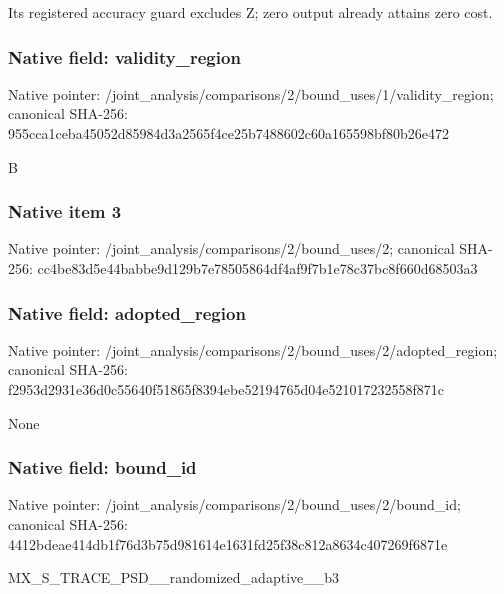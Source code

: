 \documentclass[10pt,a4paper]{article}
\begin{document}
\begingroup\raggedright\sloppy Its registered accuracy guard excludes Z;\allowbreak{} zero output already attains zero cost.\par\endgroup

\subsubsection{Native field: validity\_\allowbreak{}region}
Native pointer: /joint\_\allowbreak{}analysis/comparisons/2/bound\_\allowbreak{}uses/1/validity\_\allowbreak{}region; canonical SHA-256: 955cca1ceba45052d85984d3a2565f4ce25b7488602c60a165598bf80b26e472

\begingroup\raggedright\sloppy B\par\endgroup

\subsubsection{Native item 3}
Native pointer: /joint\_\allowbreak{}analysis/comparisons/2/bound\_\allowbreak{}uses/2; canonical SHA-256: cc4be83d5e44babbe9d129b7e78505864df4af9f7b1e78c37bc8f660d68503a3

\subsubsection{Native field: adopted\_\allowbreak{}region}
Native pointer: /joint\_\allowbreak{}analysis/comparisons/2/bound\_\allowbreak{}uses/2/adopted\_\allowbreak{}region; canonical SHA-256: f2953d2931e36d0c55640f51865f8394ebe52194765d04e521017232558f871c

\begingroup\raggedright\sloppy None\par\endgroup

\subsubsection{Native field: bound\_\allowbreak{}id}
Native pointer: /joint\_\allowbreak{}analysis/comparisons/2/bound\_\allowbreak{}uses/2/bound\_\allowbreak{}id; canonical SHA-256: 4412bdeae414db1f76d3b75d981614e1631fd25f38c812a8634c407269f6871e

\begingroup\raggedright\sloppy MX\_\allowbreak{}S\_\allowbreak{}TRACE\_\allowbreak{}PSD\_\allowbreak{}\_\allowbreak{}randomized\_\allowbreak{}adaptive\_\allowbreak{}\_\allowbreak{}b3\par\endgroup
\end{document}
